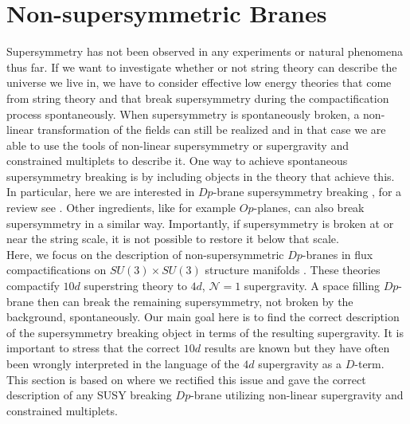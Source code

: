 \documentclass[a4paper,12pt]{report}
\begin{document}
\section{Non-supersymmetric Branes}
\label{sec:nonsusybranessec}
Supersymmetry has not been observed in any experiments or natural phenomena thus far. If we want to investigate whether or not string theory can describe the universe we live in, we have to consider effective low energy theories that come from string theory and that break supersymmetry during the compactification process spontaneously. When supersymmetry is spontaneously broken, a non-linear transformation of the fields can still be realized and in that case we are able to use the tools of non-linear supersymmetry or supergravity and constrained multiplets to describe it. One way to achieve spontaneous supersymmetry breaking is by including objects in the theory that achieve this. In particular, here we are interested in $Dp$-brane supersymmetry breaking \cite{Sugimoto:1999tx,Antoniadis:1999xk,Angelantonj:1999jh,Aldazabal:1999jr,Angelantonj:1999ms,Dudas:2000nv,Pradisi:2001yv}, for a review see \cite{Mourad:2017rrl}. Other ingredients, like for example $Op$-planes, can also break supersymmetry in a similar way. Importantly, if supersymmetry is broken at or near the string scale, it is not possible to restore it below that scale.\\
Here, we focus on the description of non-supersymmetric $Dp$-branes in flux compactifications on $SU(3)\times SU(3)$ structure manifolds \cite{Lust:2008zd}. These theories compactify $10d$ superstring theory to $4d$, $\mathcal{N}=1$ supergravity. A space filling $Dp$-brane then can break the remaining supersymmetry, not broken by the background, spontaneously. Our main goal here is to find the correct description of the supersymmetry breaking object in terms of the resulting supergravity. It is important to stress that the correct $10d$ results are known \cite{Villadoro:2006ia,Blumenhagen:2002wn,Kachru:1999vj,Cvetic:2001nr} but they have often been wrongly interpreted in the language of the $4d$ supergravity as a $D$-term. This section is based on \cite{Cribiori:2020bgt} where we rectified this issue and gave the correct description of any SUSY breaking $Dp$-brane utilizing non-linear supergravity and constrained multiplets.
\end{document}
